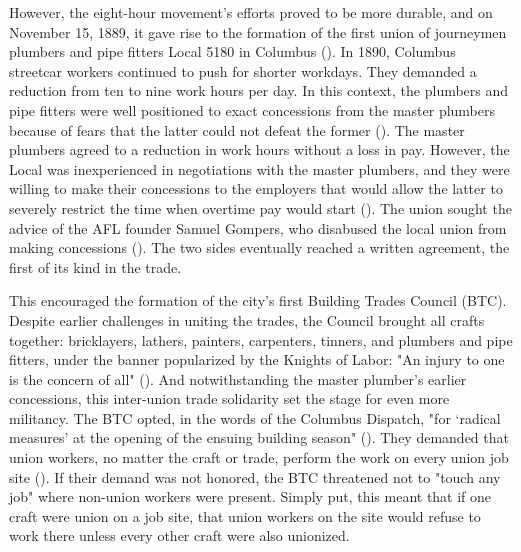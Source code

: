 \documentclass[12pt]{article}
\begin{document}
However, the eight-hour movement’s efforts proved to be more durable, and on November 15, 1889, it gave rise to the formation of the first union of journeymen plumbers and pipe fitters Local 5180 in Columbus (\cite[45]{schneirovPrideSolidarityHistory1993}). In 1890, Columbus streetcar workers continued to push for shorter workdays. They demanded a reduction from ten to nine work hours per day. In this context, the plumbers and pipe fitters were well positioned to exact concessions from the master plumbers because of fears that the latter could not defeat the former (\citeyear[45–46]{schneirovPrideSolidarityHistory1993}). The master plumbers agreed to a reduction in work hours without a loss in pay. However, the Local was inexperienced in negotiations with the master plumbers, and they were willing to make their concessions to the employers that would allow the latter to severely restrict the time when overtime pay would start (\citeyear[46–47]{schneirovPrideSolidarityHistory1993}). The union sought the advice of the AFL founder Samuel Gompers, who disabused the local union from making concessions (\citeyear[46–47]{schneirovPrideSolidarityHistory1993}). The two sides eventually reached a written agreement, the first of its kind in the trade. 

This encouraged the formation of the city’s first Building Trades Council (BTC). Despite earlier challenges in uniting the trades, the Council brought all crafts together: bricklayers, lathers, painters, carpenters, tinners, and plumbers and pipe fitters, under the banner popularized by the Knights of Labor: "An injury to one is the concern of all" (\cite[47]{schneirovPrideSolidarityHistory1993}). And notwithstanding the master plumber’s earlier concessions, this inter-union trade solidarity set the stage for even more militancy. The BTC opted, in the words of the Columbus Dispatch, "for ‘radical measures’ at the opening of the ensuing building season" (\citeyear[47]{schneirovPrideSolidarityHistory1993}). They demanded that union workers, no matter the craft or trade, perform the work on every union job site (\citeyear[47]{schneirovPrideSolidarityHistory1993}). If their demand was not honored, the BTC threatened not to "touch any job" where non-union workers were present. Simply put, this meant that if one craft were union on a job site, that union workers on the site would refuse to work there unless every other craft were also unionized.
\end{document}
